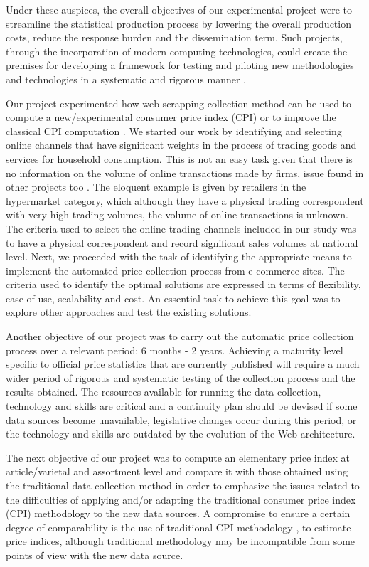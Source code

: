 \documentclass[]{article}
\begin{document}
	
	Under these auspices, the overall objectives of our experimental project were to streamline the statistical production process by 
	lowering the overall production costs, reduce the response burden and the dissemination term. Such projects, through the incorporation 
	of modern computing technologies, could create the premises for developing a framework for testing and piloting new methodologies 
	and technologies in a systematic and rigorous manner \cite{ons2017}. 
	
	
	Our project experimented how web-scrapping collection method can be used to compute a new/experimental 
	consumer price index (CPI) or to improve the classical CPI computation \cite{otawa2017}. We started our work by identifying and 
	selecting online channels that have significant weights in the process of trading goods and services for household consumption. 
	This is not an easy task given that there is no information on the volume of online transactions made by firms, 
	issue found in other projects too \cite{willenborg2017}. The eloquent 
	example is given by retailers in the hypermarket category, which although they have a physical trading correspondent with very high 
	trading volumes, the volume of online transactions is unknown. The criteria used to select the online trading channels included in 
	our study was to have a physical correspondent and record significant sales volumes at national level. Next, we proceeded with the 
	task of identifying the appropriate means to implement the automated price collection process from e-commerce sites. The criteria 
	used to identify the optimal solutions are expressed in terms of flexibility, ease of use, scalability and cost. An essential task 
	to achieve this goal was to explore other approaches and test the existing solutions. 
	
	
	Another objective of our project was to carry out the automatic price collection process over a relevant period: 6 months - 2 years. 
	Achieving a maturity level specific to official price statistics that are currently published will require a much wider period of 
	rigorous and systematic testing of the collection process and the results obtained. The resources available for running the data 
	collection, technology and skills are critical and a continuity plan should be devised if some data sources become unavailable, 
	legislative changes occur during this period, or the technology and skills are outdated by the evolution of the Web architecture. 
	
	
	The next objective of our project was to compute an elementary price index at article/varietal and assortment level and compare 
	it with those obtained using the traditional data collection method in order to emphasize the issues related to the difficulties 
	of applying and/or adapting the traditional consumer price index (CPI) methodology \cite{cpi} to the new data sources.  A compromise to 
	ensure a certain degree of comparability is the use of traditional CPI methodology \cite{cpi2}, \cite{cpi3} to estimate price indices, although 
	traditional methodology may be incompatible from some points of view with the new data source. 
	
\end{document}
